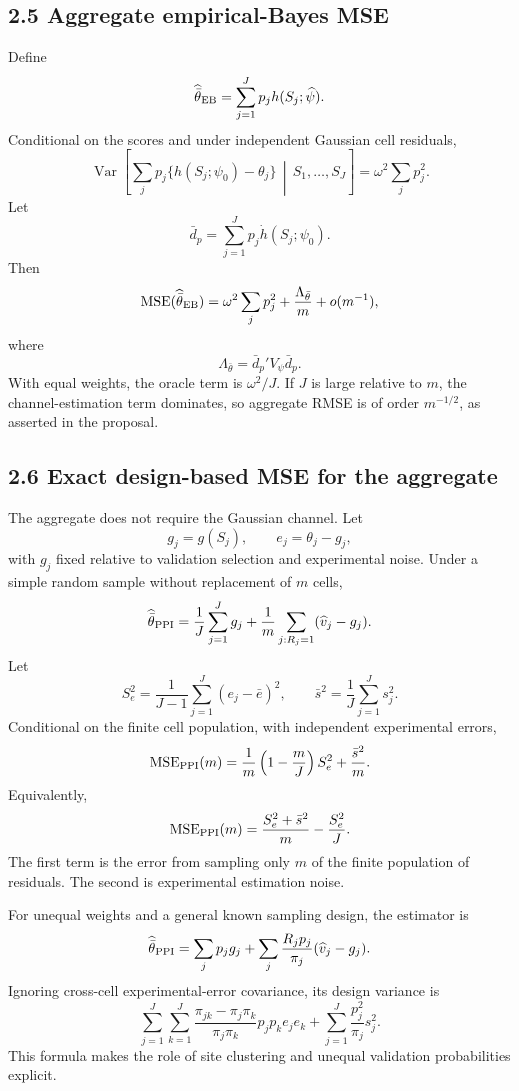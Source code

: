 \documentclass[11pt]{article}
\newcommand{\Var}{\operatorname{Var}}
\newcommand{\MSE}{\operatorname{MSE}}
\begin{document}
\subsection*{2.5 Aggregate empirical-Bayes MSE}

Define
\[
    \widehat{\bar\theta}_{\rm EB}
    =
    \sum_{j=1}^Jp_jh(S_j;\widehat\psi).
\]
Conditional on the scores and under independent Gaussian cell residuals,
\[
    \Var\!\left[
       \sum_jp_j\{h(S_j;\psi_0)-\theta_j\}
       \,\middle|\, S_1,\ldots,S_J
    \right]
    =
    \omega^2\sum_jp_j^2.
\]
Let
\[
    \bar d_p=\sum_{j=1}^Jp_j\dot h(S_j;\psi_0).
\]
Then
\[
    \MSE(\widehat{\bar\theta}_{\rm EB})
    =
    \omega^2\sum_jp_j^2
    +
    \frac{\Lambda_{\bar\theta}}{m}
    +
    o(m^{-1}),
\]
where
\[
    \Lambda_{\bar\theta}
    =
    \bar d_p'V_\psi\bar d_p.
\]
With equal weights, the oracle term is \(\omega^2/J\). If \(J\) is large
relative to \(m\), the channel-estimation term dominates, so aggregate RMSE is
of order \(m^{-1/2}\), as asserted in the proposal.

\subsection*{2.6 Exact design-based MSE for the aggregate}

The aggregate does not require the Gaussian channel. Let
\[
    g_j=g(S_j),
    \qquad
    e_j=\theta_j-g_j,
\]
with \(g_j\) fixed relative to validation selection and experimental noise.
Under a simple random sample without replacement of \(m\) cells,
\[
    \widehat{\bar\theta}_{\rm PPI}
    =
    \frac1J\sum_{j=1}^Jg_j
    +
    \frac1m\sum_{j:R_j=1}
       (\widehat v_j-g_j).
\]
Let
\[
    S_e^2
    =
    \frac1{J-1}
    \sum_{j=1}^J(e_j-\bar e)^2,
    \qquad
    \bar s^2=\frac1J\sum_{j=1}^Js_j^2.
\]
Conditional on the finite cell population, with independent experimental
errors,
\[
    \MSE_{\rm PPI}(m)
    =
    \frac1m\left(1-\frac mJ\right)S_e^2
    +
    \frac{\bar s^2}{m}.
\]
Equivalently,
\[
    \MSE_{\rm PPI}(m)
    =
    \frac{S_e^2+\bar s^2}{m}
    -
    \frac{S_e^2}{J}.
\]
The first term is the error from sampling only \(m\) of the finite population
of residuals. The second is experimental estimation noise.

For unequal weights and a general known sampling design, the estimator is
\[
    \widehat{\bar\theta}_{\rm PPI}
    =
    \sum_jp_jg_j
    +
    \sum_j\frac{R_jp_j}{\pi_j}
       (\widehat v_j-g_j).
\]
Ignoring cross-cell experimental-error covariance, its design variance is
\[
    \sum_{j=1}^J\sum_{k=1}^J
    \frac{\pi_{jk}-\pi_j\pi_k}{\pi_j\pi_k}
    p_jp_ke_je_k
    +
    \sum_{j=1}^J\frac{p_j^2}{\pi_j}s_j^2.
\]
This formula makes the role of site clustering and unequal validation
probabilities explicit.
\end{document}
